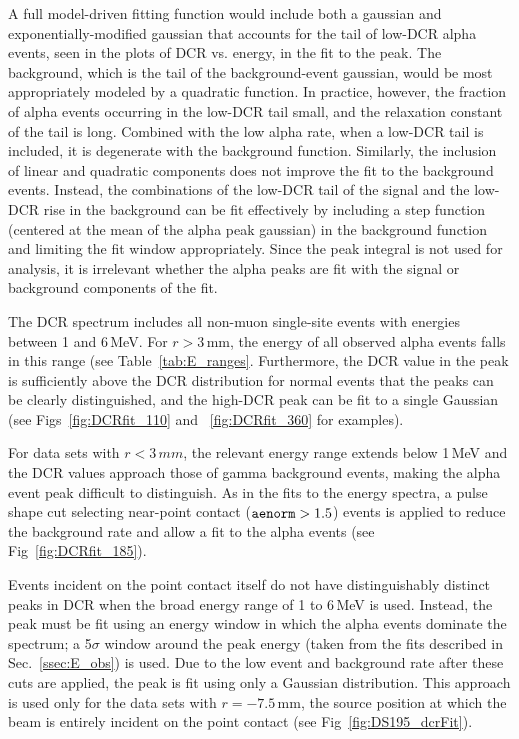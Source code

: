 \documentclass[groupedaddress,rmp,amsmath,amssymb,bibnotes,altaffilletter,twocolumn]{revtex4-1}
\begin{document}
A full model-driven fitting function would include both a gaussian and exponentially-modified gaussian that accounts for the tail of low-DCR alpha events, seen in the plots of DCR vs. energy, in the fit to the peak. The background, which is the tail of the background-event gaussian, would be most appropriately modeled by a quadratic function. In practice, however, the fraction of alpha events occurring in the low-DCR tail small, and the relaxation constant of the tail is long. Combined with the low alpha rate, when a low-DCR tail is included, it is degenerate with the background function. Similarly, the inclusion of linear and quadratic components does not improve the fit to the background events. Instead, the combinations of the low-DCR tail of the signal and the low-DCR rise in the background can be fit effectively by including a step function (centered at the mean of the alpha peak gaussian) in the background function and limiting the fit window appropriately. Since the peak integral is not used for analysis, it is irrelevant whether the alpha peaks are fit with the signal or background components of the fit. 

The DCR spectrum includes all non-muon single-site events with energies between 1 and 6\,MeV. For $r > 3$\,mm, the energy of all observed alpha events falls in this range (see Table~\ref{tab:E_ranges}. Furthermore, the DCR value in the peak is sufficiently above the DCR distribution for normal events that the peaks can be clearly distinguished, and the high-DCR peak can be fit to a single Gaussian (see Figs~\ref{fig:DCRfit_110} and ~\ref{fig:DCRfit_360} for examples).

For data sets with $r<3\,mm$, the relevant energy range extends below 1\,MeV and the DCR values approach those of gamma background events, making the alpha event peak difficult to distinguish. As in the fits to the energy spectra, a pulse shape cut selecting near-point contact (${\tt aenorm} > 1.5$) events is applied to reduce the background rate and allow a fit to the alpha events (see Fig~\ref{fig:DCRfit_185}).

Events incident on the point contact itself do not have distinguishably distinct peaks in DCR when the broad energy range of 1 to 6\,MeV is used. Instead, the peak must be fit using an energy window in which the alpha events dominate the spectrum; a 5$\sigma$ window around the peak energy (taken from the fits described in Sec.~\ref{ssec:E_obs}) is used. Due to the low event and background rate after these cuts are applied, the peak is fit using only a Gaussian distribution. This approach is used only for the data sets with $r=-7.5$\,mm, the source position at which the beam is entirely incident on the point contact (see Fig~\ref{fig:DS195_dcrFit}).
\end{document}
